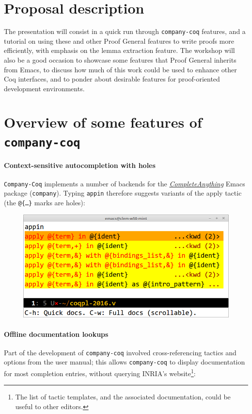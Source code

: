 \documentclass[preprint]{sigplanconf}
\newcommand{\proofg}{Proof General\xspace}
\begin{document}
\section*{Proposal description}

The presentation will consist in a quick run through \texttt{company-coq} features, and a tutorial on using these and other \proofg features to write proofs more efficiently, with emphasis on the lemma extraction feature. The workshop will also be a good occasion to showcase some features that \proofg inherits from Emacs, to discuss how much of this work could be used to enhance other Coq interfaces, and to ponder about desirable features for proof-oriented development environments.

\section*{Overview of some features of \texttt{company-coq}}

\paragraph{Context-sensitive autocompletion with holes} \texttt{Company-Coq} implements a number of backends for the \href{https://company-mode.github.io/}{\emph{CompleteAnything}} Emacs package (\texttt{company}). Typing \texttt{app{\kern0.5pt}in} therefore suggests variants of the apply tactic (the \texttt{@\{\ldots\}} marks are holes):

\begin{figure}[H]
  \centering
  \includegraphics[width=\linewidth]{apply-in-xxl-2.png}
\end{figure}

\paragraph{Offline documentation lookups} Part of the development of \texttt{company-coq} involved cross-referencing tactics and options from the user manual; this allows \texttt{company-coq} to display documentation for most completion entries, without querying INRIA's website\footnote{The list of tactic templates, and the associated documentation, could be useful to other editors.}:
\end{document}
